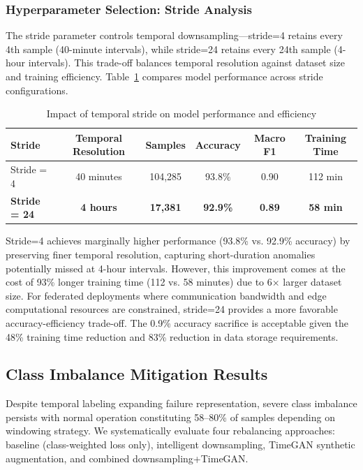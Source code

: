 \documentclass[12pt]{article}
\begin{document}
\subsubsection{Hyperparameter Selection: Stride Analysis}

The stride parameter controls temporal downsampling—stride=4 retains every 4th sample (40-minute intervals), while stride=24 retains every 24th sample (4-hour intervals). This trade-off balances temporal resolution against dataset size and training efficiency. Table~\ref{tab:stride_comparison} compares model performance across stride configurations.

\begin{table}[htbp]
\centering
\caption{Impact of temporal stride on model performance and efficiency}
\label{tab:stride_comparison}
\begin{tabular}{lccccc}
\toprule
\textbf{Stride} & \textbf{Temporal Resolution} & \textbf{Samples} & \textbf{Accuracy} & \textbf{Macro F1} & \textbf{Training Time} \\
\midrule
Stride = 4 & 40 minutes & 104,285 & 93.8\% & 0.90 & 112 min \\
\textbf{Stride = 24} & \textbf{4 hours} & \textbf{17,381} & \textbf{92.9\%} & \textbf{0.89} & \textbf{58 min} \\
\bottomrule
\end{tabular}
\end{table}

Stride=4 achieves marginally higher performance (93.8\% vs. 92.9\% accuracy) by preserving finer temporal resolution, capturing short-duration anomalies potentially missed at 4-hour intervals. However, this improvement comes at the cost of 93\% longer training time (112 vs. 58 minutes) due to 6× larger dataset size. For federated deployments where communication bandwidth and edge computational resources are constrained, stride=24 provides a more favorable accuracy-efficiency trade-off. The 0.9\% accuracy sacrifice is acceptable given the 48\% training time reduction and 83\% reduction in data storage requirements.

\subsection{Class Imbalance Mitigation Results}

Despite temporal labeling expanding failure representation, severe class imbalance persists with normal operation constituting 58--80\% of samples depending on windowing strategy. We systematically evaluate four rebalancing approaches: baseline (class-weighted loss only), intelligent downsampling, TimeGAN synthetic augmentation, and combined downsampling+TimeGAN.
\end{document}
